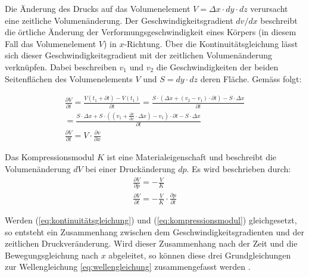 Die Änderung des Drucks auf das Volumenelement $V=\Delta x \cdot dy\cdot dz$ verursacht eine zeit\-liche Volumenänderung. Der Geschwindigkeitsgradient $dv/dx$ beschreibt die örtliche Änderung der Verformungsgeschwindigkeit eines Körpers (in diesem Fall das Volumenelement $V$) in $x$-Richtung. Über die Kontinuitätsgleichung lässt sich dieser Geschwindigkeitsgradient mit der zeitlichen Volumenänderung verknüpfen. Dabei beschreiben $v_{1}$ und $v_{2}$ die Geschwindigkeiten der beiden Seitenflächen  des Volumenelements $V$ und $S = dy \cdot dz$ deren Fläche. Gemäss \cite{HERING} folgt:

\begin{equation}
\begin{gathered}
\frac{\partial V}{\partial t} = \frac{V(t_{1}+\partial t)-V(t_{1})}{\partial t}= \frac{ S \cdot (\Delta x + (v_{2}-v_{1})\cdot \partial t) - S \cdot \Delta x} {\partial t} \\
= \frac{ S \cdot \Delta x + S \cdot ((v_{1}+ \frac{\partial v}{\partial x}\cdot \Delta x)-v_{1}) \cdot \partial t - S \cdot\Delta x} {\partial t} \\
\frac{\partial V}{\partial t} = V \cdot \frac{\partial v}{\partial x}
\end{gathered}\label{eq:kontinuitätsgleichung}
\end{equation}

Das Kompressionsmodul $K$ ist eine Materialeigenschaft und beschreibt die Volumenänderung $dV$ bei einer Druckänderung $dp$. Es wird beschrieben durch:
\begin{equation}
\begin{gathered}
\frac{\partial V}{\partial p} = -\frac{V}{K}\\
\frac{\partial V}{\partial t} = -\frac{V}{K} \cdot \frac{\partial p}{\partial t}
\end{gathered}\label{eq:kompressionsmodul}
\end{equation}

Werden (\ref{eq:kontinuitätsgleichung}) und (\ref{eq:kompressionsmodul}) gleichgesetzt, so entsteht ein Zusammenhang zwischen dem Geschwindigkeitsgradienten und der zeitlichen Druckveränderung. Wird dieser Zusammenhang nach der Zeit und die Bewegungsgleichung nach $x$ abgeleitet, so können diese drei Grundgleichungen zur Wellengleichung \ref{eq:wellengleichung} zusammengefasst werden \cite{HERING}.

